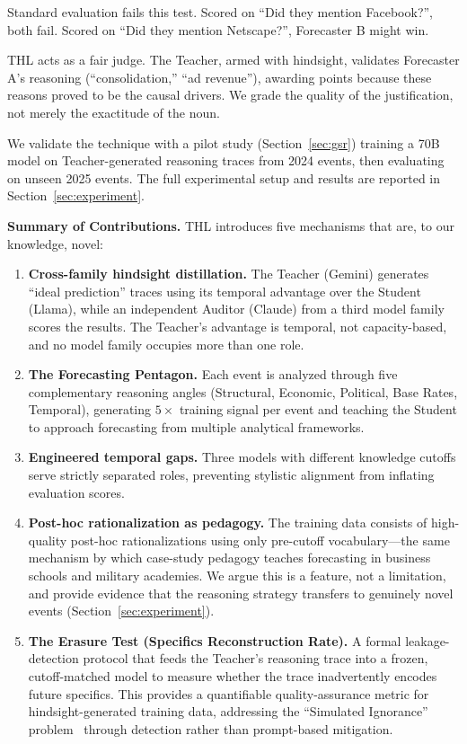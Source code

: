 \documentclass[11pt,a4paper]{article}
\begin{document}
Standard evaluation fails this test. Scored on ``Did they mention Facebook?'', both fail. Scored on ``Did they mention Netscape?'', Forecaster B might win.

THL acts as a fair judge. The Teacher, armed with hindsight, validates Forecaster A's reasoning (``consolidation,'' ``ad revenue''), awarding points because these reasons proved to be the causal drivers. We grade the quality of the justification, not merely the exactitude of the noun.

We validate the technique with a pilot study (Section~\ref{sec:gsr}) training a 70B model on Teacher-generated reasoning traces from 2024 events, then evaluating on unseen 2025 events. The full experimental setup and results are reported in Section~\ref{sec:experiment}.

\medskip\noindent\textbf{Summary of Contributions.}
THL introduces five mechanisms that are, to our knowledge, novel:

\begin{enumerate}
    \item \textbf{Cross-family hindsight distillation.} The Teacher (Gemini) generates ``ideal prediction'' traces using its temporal advantage over the Student (Llama), while an independent Auditor (Claude) from a third model family scores the results. The Teacher's advantage is temporal, not capacity-based, and no model family occupies more than one role.

    \item \textbf{The Forecasting Pentagon.} Each event is analyzed through five complementary reasoning angles (Structural, Economic, Political, Base Rates, Temporal), generating $5\times$ training signal per event and teaching the Student to approach forecasting from multiple analytical frameworks.

    \item \textbf{Engineered temporal gaps.} Three models with different knowledge cutoffs serve strictly separated roles, preventing stylistic alignment from inflating evaluation scores.

    \item \textbf{Post-hoc rationalization as pedagogy.} The training data consists of high-quality post-hoc rationalizations using only pre-cutoff vocabulary---the same mechanism by which case-study pedagogy teaches forecasting in business schools and military academies. We argue this is a feature, not a limitation, and provide evidence that the reasoning strategy transfers to genuinely novel events (Section~\ref{sec:experiment}).

    \item \textbf{The Erasure Test (Specifics Reconstruction Rate).} A formal leakage-detection protocol that feeds the Teacher's reasoning trace into a frozen, cutoff-matched model to measure whether the trace inadvertently encodes future specifics. This provides a quantifiable quality-assurance metric for hindsight-generated training data, addressing the ``Simulated Ignorance'' problem~\cite{li2026simulated} through detection rather than prompt-based mitigation.
\end{enumerate}
\end{document}

